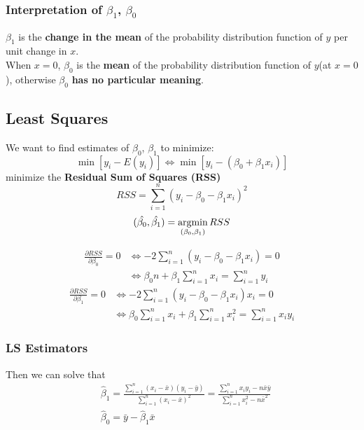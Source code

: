 \documentclass[11pt,a4paper]{article}
\newcommand{\argmin}{\operatornamewithlimits{argmin}}
\begin{document}
\subsubsection{Interpretation of $\beta_1$, $\beta_0$}
$\beta_1$ is the \textbf{change in the mean} of the probability distribution function of $y$ per unit change in $x$.\\
When $x=0$, $\beta_0$ is the \textbf{mean} of the probability distribution function of $y$(at $x=0$), otherwise $\beta_0$ \textbf{has no particular meaning}.\\

\subsection{Least Squares}
We want to find estimates of $\beta_0$, $\beta_1$ to minimize:
$$\min [y_i-E(y_i)]\Leftrightarrow \min [y_i-(\beta_0+\beta_1 x_i)]$$
minimize the \textbf{Residual Sum of Squares (RSS)}
$$RSS=\sum_{i=1}^n(y_i-\beta_0-\beta_1 x_i)^2$$
$$(\hat{\beta_0},\hat{\beta_1})=\argmin_{(\beta_0,\beta_1)}RSS$$

$$\begin{aligned}
    \frac{\partial RSS}{\partial \beta_0}=0 &\Leftrightarrow -2\sum_{i=1}^n(y_i-\beta_0-\beta_1 x_i)=0\\
    & \Leftrightarrow \beta_0 n+\beta_1\sum_{i=1}^n x_i=\sum_{i=1}^n y_i
\end{aligned}$$
$$\begin{aligned}
    \frac{\partial RSS}{\partial \beta_1}=0 &\Leftrightarrow -2\sum_{i=1}^n(y_i-\beta_0-\beta_1 x_i)x_i=0\\
    &\Leftrightarrow \beta_0 \sum_{i=1}^nx_i+\beta_1\sum_{i=1}^n x_i^2=\sum_{i=1}^n x_iy_i
\end{aligned}$$

\subsubsection{LS Estimators}
Then we can solve that
$$\begin{aligned}
&\hat{\beta}_{1}=\frac{\sum_{i=1}^{n}\left(x_{i}-\bar{x}\right)\left(y_{i}-\bar{y}\right)}{\sum_{i=1}^{n}\left(x_{i}-\bar{x}\right)^{2}}=\frac{\sum_{i=1}^{n} x_{i} y_{i}-n \bar{x} \bar{y}}{\sum_{i=1}^{n} x_{i}^{2}-n \bar{x}^{2}} \\
&\hat{\beta}_{0}=\bar{y}-\hat{\beta}_{1} \bar{x}
\end{aligned}$$
\end{document}
